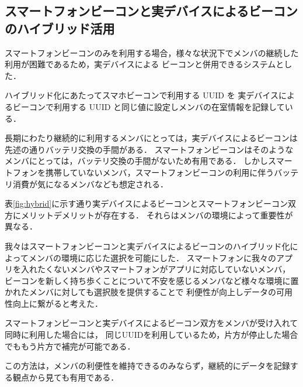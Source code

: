 \subsection{スマートフォンビーコンと実デバイスによるビーコンのハイブリッド活用}
スマートフォンビーコンのみを利用する場合，様々な状況下でメンバの継続した利用が困難であるため，実デバイスによる
ビーコンと併用できるシステムとした．

ハイブリッド化にあたってスマホビーコンで利用する UUID を
実デバイスによるビーコンで利用する UUID と同じ値に設定しメンバの在室情報を記録している．

長期にわたり継続的に利用するメンバにとっては，実デバイスによるビーコンは先述の通りバッテリ交換の手間がある．
スマートフォンビーコンはそのようなメンバにとっては，バッテリ交換の手間がないため有用である．
しかしスマートフォンを携帯していないメンバ，スマートフォンビーコンの利用に伴うバッテリ消費が気になるメンバなども想定される．

表\ref{fig:hybrid}に示す通り実デバイスによるビーコンとスマートフォンビーコン双方にメリットデメリットが存在する．
それらはメンバの環境によって重要性が異なる．

我々はスマートフォンビーコンと実デバイスによるビーコンのハイブリッド化によってメンバの環境に応じた選択を可能にした．
スマートフォンに我々のアプリを入れたくないメンバやスマートフォンがアプリに対応していないメンバ，
ビーコンを新しく持ち歩くことについて不安を感じるメンバなど様々な環境に置かれたメンバに対しても選択肢を提供することで
利便性が向上しデータの可用性向上に繋がると考えた．

スマートフォンビーコンと実デバイスによるビーコン双方をメンバが受け入れて同時に利用した場合には，
同じUUIDを利用しているため，片方が停止した場合でももう片方で補完が可能である．

この方法は，メンバの利便性を維持できるのみならず，継続的にデータを記録する観点から見ても有用である．


